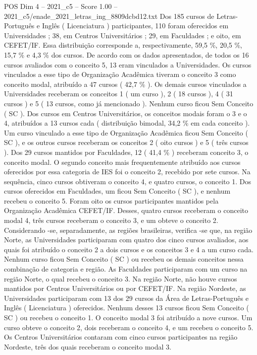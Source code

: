 \begin{textsample}{POS Dim 4 – 2021\_c5 – Score 1.00 – 2021\_c5/enade\_2021\_letras\_ing\_8809dcbd12.txt}
Dos 185 cursos de Letras-Português e Inglês ( Licenciatura ) participantes, 110 foram oferecidos em Universidades ; 38, em Centros Universitários ; 29, em Faculdades ; e oito, em CEFET/IF.
Essa distribuição corresponde a, respectivamente, 59,5 \%, 20,5 \%, 15,7 \% e 4,3 \% dos cursos.
De acordo com os dados apresentados, de todos os 16 cursos avaliados com o conceito 5, 13 eram vinculados a Universidades.
Os cursos vinculados a esse tipo de Organização Acadêmica tiveram o conceito 3 como conceito modal, atribuído a 47 cursos ( 42,7 \% ).
Os demais cursos vinculados a Universidades receberam os conceitos 1 ( um curso ), 2 ( 18 cursos ), 4 ( 31 cursos ) e 5 ( 13 cursos, como já mencionado ).
Nenhum curso ficou Sem Conceito ( SC ).
Dos cursos em Centros Universitários, os conceitos modais foram o 3 e o 4, atribuídos a 13 cursos cada ( distribuição bimodal, 34,2 \% em cada conceito ).
Um curso vinculado a esse tipo de Organização Acadêmica ficou Sem Conceito ( SC ), e os outros cursos receberam os conceitos 2 ( oito cursos ) e 5 ( três cursos ).
Dos 29 cursos mantidos por Faculdades, 12 ( 41,4 \% ) receberam conceito 3, o conceito modal.
O segundo conceito mais frequentemente atribuído aos cursos oferecidos por essa categoria de IES foi o conceito 2, recebido por sete cursos.
Na sequência, cinco cursos obtiveram o conceito 4, e quatro cursos, o conceito 1.
Dos cursos oferecidos em Faculdades, um ficou Sem Conceito ( SC ), e nenhum recebeu o conceito 5.
Foram oito os cursos participantes mantidos pela Organização Acadêmica CEFET/IF.
Desses, quatro cursos receberam o conceito modal 4, três cursos receberam o conceito 3, e um obteve o conceito 2.
Considerando -se, separadamente, as regiões brasileiras, verifica -se que, na região Norte, as Universidades participaram com quatro dos cinco cursos avaliados, aos quais foi atribuído o conceito 2 a dois cursos e os conceitos 3 e 4 a um curso cada.
Nenhum curso ficou Sem Conceito ( SC ) ou recebeu os demais conceitos nessa combinação de categoria e região.
As Faculdades participaram com um curso na região Norte, o qual recebeu o conceito 3.
Na região Norte, não houve cursos mantidos por Centros Universitários ou por CEFET/IF.
Na região Nordeste, as Universidades participaram com 13 dos 29 cursos da Área de Letras-Português e Inglês ( Licenciatura ) oferecidos.
Nenhum desses 13 cursos ficou Sem Conceito ( SC ) ou recebeu o conceito 1.
O conceito modal 3 foi atribuído a nove cursos.
Um curso obteve o conceito 2, dois receberam o conceito 4, e um recebeu o conceito 5.
Os Centros Universitários contaram com cinco cursos participantes na região Nordeste, três dos quais receberam o conceito modal 3.

\end{textsample}
